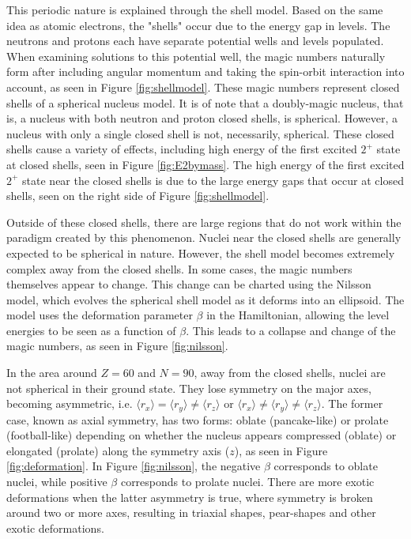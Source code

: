 This periodic nature is explained through the shell model. Based on the same idea as atomic electrons, the "shells" occur due to the energy gap in levels. The neutrons and protons each have separate potential wells and levels populated. When examining solutions to this potential well, the magic numbers naturally form after including angular momentum and taking the spin-orbit interaction into account, as seen in Figure \ref{fig:shellmodel}. These magic numbers represent closed shells of a spherical nucleus model. It is of note that a doubly-magic nucleus, that is, a nucleus with both neutron and proton closed shells, is spherical. However, a nucleus with only a single closed shell is not, necessarily, spherical. These closed shells cause a variety of effects, including high energy of the first excited $2^+$ state at closed shells, seen in Figure \ref{fig:E2bymass}. The high energy of the first excited $2^+$ state near the closed shells is due to the large energy gaps that occur at closed shells, seen on the right side of Figure \ref{fig:shellmodel}.





% 

Outside of these closed shells, there are large regions that do not work within the paradigm created by this phenomenon. Nuclei near the closed shells are generally expected to be spherical in nature. However, the shell model becomes extremely complex away from the closed shells. In some cases, the magic numbers themselves appear to change. This change can be charted using the Nilsson model, which evolves the spherical shell model as it deforms into an ellipsoid. The model uses the \mbox{deformation} parameter $\beta$ in the Hamiltonian, allowing the level energies to be seen as a function of $\beta$. This leads to a collapse and change of the magic numbers, as seen in Figure \ref{fig:nilsson}.



In the area around $Z=60$ and $N=90$, away from the closed shells, nuclei are not spherical in their ground state. They lose symmetry on the major axes, becoming asymmetric, i.e. $\langle r_x \rangle=\langle r_y\rangle\neq \langle r_z\rangle$ or $\langle r_x \rangle \neq \langle r_y \rangle \neq \langle r_z \rangle$. The former case, known as axial symmetry, has two forms: oblate (pancake-like) or prolate (football-like) depending on whether the nucleus appears compressed (oblate) or elongated (prolate) along the symmetry axis ($z$), as seen in Figure \ref{fig:deformation}. In Figure \ref{fig:nilsson}, the negative $\beta$ corresponds to oblate nuclei, while positive $\beta$ corresponds to prolate nuclei. There are more exotic deformations when the latter asymmetry is true, where symmetry is broken around two or more axes, resulting in triaxial shapes, pear-shapes and other exotic deformations.

